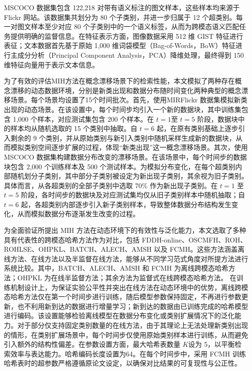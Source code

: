 MSCOCO 数据集包含 122,218 对带有语义标注的图文样本，这些样本均来源于 Flickr 网站。该数据集共划分为 80 个子类别，并进一步归属于 12 个超类别。每一对图文样本至少对应 80 个子类别中的一个语义标签，从而为跨模态语义匹配任务提供明确的监督信息。在特征表示方面，图像数据采用 512 维 GIST 特征进行表征；文本数据首先基于原始 1,000 维词袋模型（Bag-of-Words，BoW）特征进行主成分分析（Principal Component Analysis，PCA）降维处理，最终得到 150 维特征向量用于表示文本信息。

为了有效的评估MIH方法在概念漂移场景下的检索性能，本文模拟了两种存在概念漂移的动态数据环境，分别是新类出现和数据分布随时间变化两种典型的概念漂移场景。每个场景均设置了15个时间批次。首先，使用MIRFlickr 数据集模拟新类出现的动态场景。在该设置中，每个时间步均引入一个新的数据块，其中训练集包含 1,000 个样本，对应测试集包含 200 个样本。在 $t = 1$至 $t = 5$ 阶段，数据块中的样本均从随机选取的 15 个类别中抽取。自 $t = 6$ 起，在原有类别基础上逐步引入剩余的 9 个类别，并从原始类别与新引入类别中随机采样生成新的数据块，从而模拟类别空间逐步扩展的过程，体现“新类出现”这一概念漂移场景。其次，使用MSCOCO 数据集构建数据分布改变的漂移场景。在该场景中，每个时间步的数据块包含 2,000 个训练样本及 500 个测试样本。为模拟分布变化，在每个超类别内部随机划分子类别，其中部分子类别被设定为新出现子类别，其余视为旧子类别。具体而言，从各超类别的全部子类别中选取 70\% 作为新出现子类别。在 $t = 1$ 至 $t = 5$ 阶段，各时间步的数据块及对应测试集均仅从旧子类别样本中随机抽取；自 $t = 6$ 起，各超类别内部逐步引入新子类别样本，导致整体数据分布结构发生变化，从而模拟数据分布逐渐发生改变的过程。

为全面验证所提出 MIH 方法在动态环境下的有效性与泛化能力，本文选取了多种具有代表性的跨模态哈希方法作为对比，包括 FDDH-online、OSCMFH、ROH、ROHLSE、OHPKL、BATCH、ALECH、AMSH 以及 FCMH。这些方法涵盖离线方法、在线方法以及半监督在线方法，能够从不同学习范式角度对所提方法进行系统比较。其中，BATCH、ALECH、AMSH 和 FCMH 为离线跨模态哈希方法；OHPKL 为在线半监督方法；其余方法为监督式在线跨模态哈希方法。
在训练机制设计上，为保证实验公平性并突出在线方法在动态环境中的优势，离线跨模态哈希方法仅在第一个时间步进行训练，随后模型参数保持固定，不再进行参数更新，也不利用新到达的数据进行增量学习；新到达的数据由已训练完成的哈希模型进行编码。该设置能够检验离线模型在数据分布变化或类别扩展情况下的泛化能力。对于部分仅支持固定类别数量的在线方法，由于其理论上无法处理新类别出现的情形，在类别扩展场景中，每个时间步仅使用原始类别样本进行训练，从而避免引入额外的结构性偏差。在参数设置方面，最大哈希表数量 $K$设为 5，以平衡检索效率与表达能力。哈希编码长度设置为64。在每个时间步中，采用 FCMH 训练哈希表时的超参数严格遵循原论文设定，以确保对比结果的可复现性与公正性。


